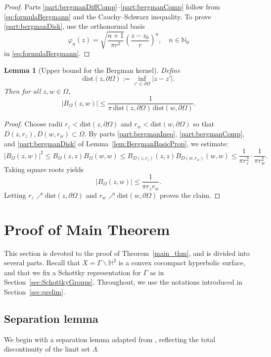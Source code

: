 \documentclass[12pt,letterpaper]{amsart}
\theoremstyle{plain}
\newtheorem{lemma}[prop]{Lemma}
\theoremstyle{definition}
\theoremstyle{remark}
\newcommand{\HH}{\mathbb{H}}
\begin{document}
\begin{proof}
Parts \eqref{part:bergmanDiffComp}–\eqref{part:bergmanComp} follow from \eqref{eq:formulaBergmann} and the Cauchy–Schwarz inequality. To prove \eqref{part:bergmanDisk}, use the orthonormal basis
\[
\varphi_n(z) = \sqrt{\frac{n+1}{\pi r^2}} \left( \frac{z - z_0}{r} \right)^n, \quad n \in \mathbb{N}_0
\]
in \eqref{eq:formulaBergmann}.
\end{proof}

\begin{lemma}[Upper bound for the Bergman kernel]\label{lem:UpperBoundBergman}
Define
\[
\mathrm{dist}(z, \partial\Omega) := \inf_{z' \in \partial\Omega} |z - z'|.
\]
Then for all $z, w \in \Omega$,
\begin{equation}\label{UpperBoundBergmanineq}
|B_\Omega(z,w)| \le \frac{1}{\pi \, \mathrm{dist}(z, \partial\Omega) \, \mathrm{dist}(w, \partial\Omega)}.
\end{equation}
\end{lemma}

\begin{proof}
Choose radii $r_z < \mathrm{dist}(z, \partial\Omega)$ and $r_w < \mathrm{dist}(w, \partial\Omega)$ so that $D(z, r_z), D(w, r_w) \subset \Omega$. By parts \eqref{part:bergmanIneq}, \eqref{part:bergmanComp}, and \eqref{part:bergmanDisk} of Lemma~\ref{lem:BergmanBasicProp}, we estimate:
\[
|B_\Omega(z,w)|^2 \le B_\Omega(z,z) B_\Omega(w,w)
\le B_{D(z, r_z)}(z,z) B_{D(w, r_w)}(w,w)
\le \frac{1}{\pi r_z^2} \cdot \frac{1}{\pi r_w^2}.
\]
Taking square roots yields
\[
|B_\Omega(z,w)| \le \frac{1}{\pi r_z r_w}.
\]
Letting $r_z \nearrow \mathrm{dist}(z, \partial\Omega)$ and $r_w \nearrow \mathrm{dist}(w, \partial\Omega)$ proves the claim.
\end{proof}

\section{Proof of Main Theorem}\label{sec:proofMainThm}
This section is devoted to the proof of Theorem~\ref{main_thm}, and is divided into several parts. Recall that $X = \Gamma \backslash \HH^2$ is a convex cocompact hyperbolic surface, and that we fix a Schottky representation for $\Gamma$ as in Section~\ref{sec:SchottkyGroups}. Throughout, we use the notations introduced in Section~\ref{sec:prelim}.

\subsection{Separation lemma}\label{sec:separation}
We begin with a separation lemma adapted from \cite[Lemma~4.4]{JN}, reflecting the total discontinuity of the limit set $\Lambda$.
\end{document}
